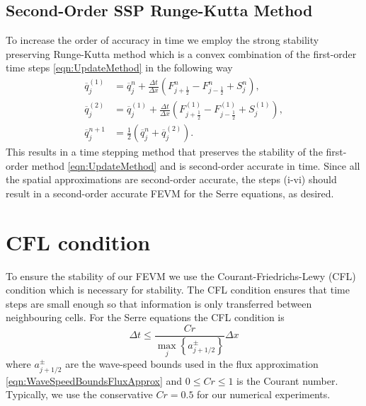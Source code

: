 \subsection{Second-Order SSP Runge-Kutta Method}
To increase the order of accuracy in time we employ the strong stability preserving Runge-Kutta method \cite{Gottlieb-etal-2003-89} which is a convex combination of the first-order time steps \eqref{eqn:UpdateMethod} in the following way
\begin{subequations}
\begin{align}
\overline{q}_j^{(1)} &= \overline{q}^{n}_j + \frac{\Delta t}{\Delta x} \left(F^n_{j+\frac{1}{2}} - F^n_{j-\frac{1}{2}} + S^n_j\right),\\
\overline{q}_j^{(2)} &= \overline{q}_j^{(1)} + \frac{\Delta t}{\Delta x} \left(F_{j+\frac{1}{2}}^{(1)} - F_{j-\frac{1}{2}}^{(1)}  + S_j^{(1)} \right), \\
\overline{q}^{n+1}_j &= \frac{1}{2} \left( \overline{q}^n_j +  \overline{q}_j^{(2)}  \right).
\end{align}
\label{eqn:SSPRKStep1}
\end{subequations}
This results in a time stepping method that preserves the stability of the first-order method \eqref{eqn:UpdateMethod} and is second-order accurate in time. Since all the spatial approximations are second-order accurate, the steps (i-vi) should result in a second-order accurate FEVM for the Serre equations, as desired. 


\section{CFL condition}
To ensure the stability of our FEVM we use the Courant-Friedrichs-Lewy (CFL) condition \cite{Courant-etal-1967-215} which is necessary for stability. The CFL condition ensures that time steps are small enough so that information is only transferred between neighbouring cells. For the Serre equations the CFL condition is 
\begin{equation}
\Delta t \le \frac{Cr }{\max_{j} \left\lbrace a^\pm_{j+1/2} \right\rbrace} \Delta x
\label{eqn:CFLcond}
\end{equation}
where $a^\pm_{j+1/2} $ are the wave-speed bounds used in the flux approximation \eqref{eqn:WaveSpeedBoundsFluxApprox} and $0\le Cr \le 1$ is the Courant number. Typically, we use the conservative $Cr = 0.5$ for our numerical experiments. 

